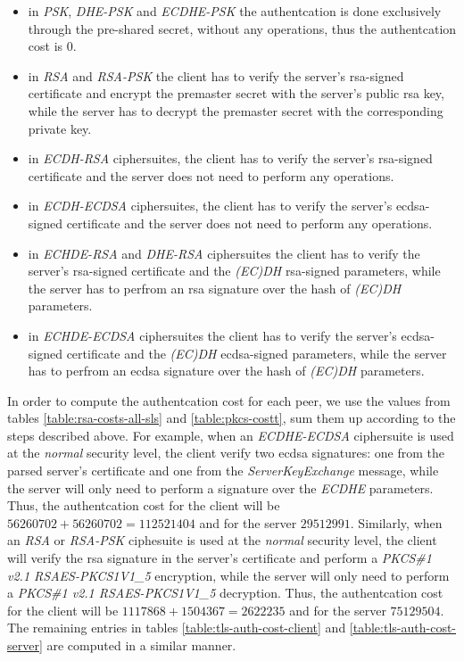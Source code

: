 \documentclass{llncs}
\begin{document}
\begin{itemize}
  \item  in \textit{PSK}, \textit{DHE-PSK} and \textit{ECDHE-PSK} the authentcation is done exclusively through the pre-shared secret, without any
  operations, thus the authentcation cost is $0$. 
  \item in \textit{RSA} and \textit{RSA-PSK} the client has to verify the server's \gls{rsa}-signed certificate and encrypt the premaster secret with
  the server's public \gls{rsa} key, while the server has to decrypt the premaster secret with the corresponding private key.
  \item in \textit{ECDH-RSA} ciphersuites, the client has to verify the server's \gls{rsa}-signed certificate and the server does not
  need to perform any operations.
  \item in \textit{ECDH-ECDSA} ciphersuites, the client has to verify the server's \gls{ecdsa}-signed certificate and the server does not
  need to perform any operations.
  \item in \textit{ECHDE-RSA} and \textit{DHE-RSA} ciphersuites the client has to verify the server's \gls{rsa}-signed certificate and 
  the \textit{(EC)DH} \gls{rsa}-signed parameters, while the server has to perfrom an \gls{rsa} signature over the hash of \textit{(EC)DH} parameters.
  \item in \textit{ECHDE-ECDSA} ciphersuites the client has to verify the server's \gls{ecdsa}-signed certificate and 
  the \textit{(EC)DH} \gls{ecdsa}-signed parameters, while the server has to perfrom an \gls{ecdsa} signature over the hash of \textit{(EC)DH} parameters.
\end{itemize}

In order to compute the authentcation cost for each peer, we use the values from tables \ref{table:rsa-costs-all-sls} and \ref{table:pkcs-costt}, 
sum them up according to the steps described above. For example, when an \textit{ECDHE-ECDSA} ciphersuite is used at the \textit{normal} security level, 
the client verify two \gls{ecdsa} signatures: one from the parsed server's certificate 
and one from the \textit{ServerKeyExchange} message, while the server will only need to perform a signature over the \textit{ECDHE} parameters. 
Thus, the authentcation cost for the client will be $56260702+56260702=112521404$ and for the server $29512991$. Similarly, when an \textit{RSA} or 
\textit{RSA-PSK} ciphesuite is used at the \textit{normal} security level, the client will verify the \gls{rsa} signature in the server's certificate 
and perform a \textit{PKCS\#1 v2.1 RSAES-PKCS1\-V1\_5} encryption, while the server will only need to perform a
\textit{PKCS\#1 v2.1 RSAES-PKCS1\-V1\_5} decryption. Thus, the authentcation cost for the client will be $1117868+1504367=2622235$ and for the server
$75129504$. The remaining entries in tables \ref{table:tls-auth-cost-client} and \ref{table:tls-auth-cost-server} are computed in a similar manner.
\end{document}
